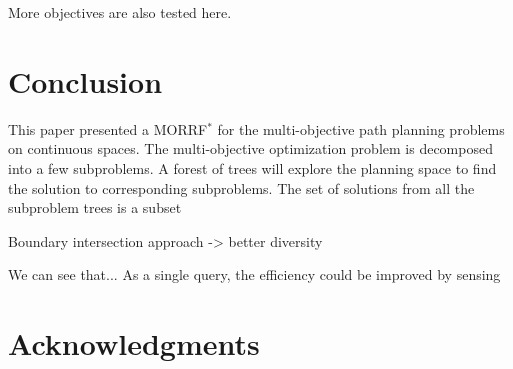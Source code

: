 \documentclass[conference]{IEEEtran}
\begin{document}
 
More objectives are also tested here.

\section{Conclusion} 
\label{sec:conclusion}

This paper presented a MORRF$^{*}$ for the multi-objective path planning problems on continuous spaces.
The multi-objective optimization problem is decomposed into a few subproblems.
A forest of trees will explore the planning space to find the solution to corresponding subproblems.
The set of solutions from all the subproblem trees is a subset 

Boundary intersection approach -> better diversity

We can see that...
As a single query, the efficiency could be improved by sensing 

\section*{Acknowledgments}




\end{document}

